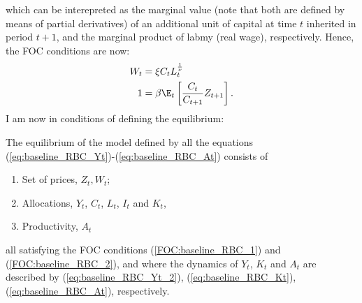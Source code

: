 \documentclass{article}
\begin{document}
which can be interepreted as the marginal value (note that both are defined by means of partial derivatives) of an additional unit of capital at time $t$ inherited in period $t+1$, and the marginal product of labmy (real wage), respectively. Hence, the FOC conditions are now:
\begin{align}
	W_t &=\xi C_tL_t^{\frac{1}{\nu}} \label{FOC:baseline_RBC_1}\\
	1 & = \beta\E_t\left[\frac{C_t}{C_{t+1}}Z_{t+1}\right]\label{FOC:baseline_RBC_2}.
\end{align}
I am now in conditions of defining the equilibrium:
\begin{defi}
	The equilibrium of the model defined by all the equations (\ref{eq:baseline_RBC_Yt})-(\ref{eq:baseline_RBC_At}) consists of
	\begin{enumerate}
		\item Set of prices, $Z_t, W_t$;
		\item Allocations, $Y_t$, $C_t$, $L_t$, $I_t$ and $K_t$,
		\item Productivity, $A_t$
	\end{enumerate}
	all satisfying the FOC conditions (\ref{FOC:baseline_RBC_1}) and (\ref{FOC:baseline_RBC_2}), and where the dynamics of $Y_t$, $K_t$ and $A_t$ are described by (\ref{eq:baseline_RBC_Yt_2}), (\ref{eq:baseline_RBC_Kt}), (\ref{eq:baseline_RBC_At}), respectively.
\end{defi}
\end{document}
